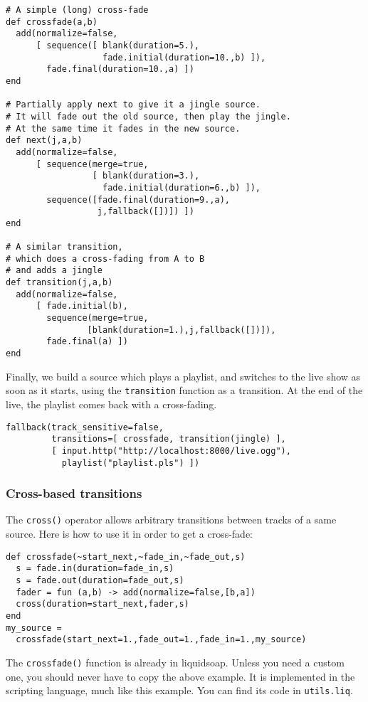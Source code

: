 \begin{verbatim}
# A simple (long) cross-fade
def crossfade(a,b)
  add(normalize=false,
	  [ sequence([ blank(duration=5.),
	               fade.initial(duration=10.,b) ]),
	    fade.final(duration=10.,a) ])
end

# Partially apply next to give it a jingle source.
# It will fade out the old source, then play the jingle.
# At the same time it fades in the new source.
def next(j,a,b)
  add(normalize=false,
	  [ sequence(merge=true,
	             [ blank(duration=3.),
	               fade.initial(duration=6.,b) ]),
	    sequence([fade.final(duration=9.,a),
	              j,fallback([])]) ])
end

# A similar transition,
# which does a cross-fading from A to B
# and adds a jingle
def transition(j,a,b)
  add(normalize=false,
	  [ fade.initial(b),
	    sequence(merge=true,
	            [blank(duration=1.),j,fallback([])]),
	    fade.final(a) ])
end
\end{verbatim}
Finally, we build a source which plays a playlist, and switches to the live show as soon as it starts, using the \verb+transition+ function as a transition. At the end of the live, the playlist comes back with a cross-fading.

\begin{verbatim}
fallback(track_sensitive=false,
	     transitions=[ crossfade, transition(jingle) ],
	     [ input.http("http://localhost:8000/live.ogg"),
	       playlist("playlist.pls") ])
\end{verbatim}
\subsubsection{Cross-based transitions}
The \verb+cross()+ operator allows arbitrary transitions between tracks of a same source. Here is how to use it in order to get a cross-fade:

\begin{verbatim}
def crossfade(~start_next,~fade_in,~fade_out,s)
  s = fade.in(duration=fade_in,s)
  s = fade.out(duration=fade_out,s)
  fader = fun (a,b) -> add(normalize=false,[b,a])
  cross(duration=start_next,fader,s)
end
my_source =
  crossfade(start_next=1.,fade_out=1.,fade_in=1.,my_source)
\end{verbatim}
The \verb+crossfade()+ function is already in liquidsoap. Unless you need a custom one, you should never have to copy the above example. It is implemented in the scripting language, much like this example. You can find its code in \verb+utils.liq+.

